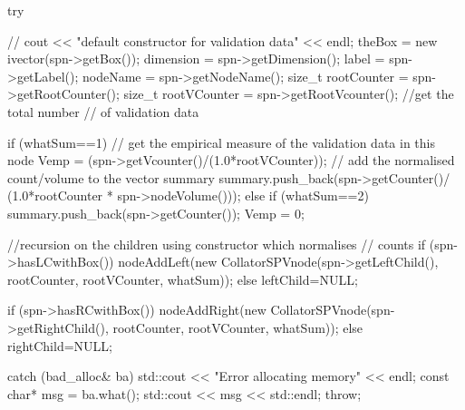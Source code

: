 \begin{DoxyCode}
    {
        try {
         //   cout << "default constructor for validation data" << endl;
            theBox = new ivector(spn->getBox());
            dimension = spn->getDimension();
            label = spn->getLabel();
            nodeName = spn->getNodeName();
            size_t rootCounter = spn->getRootCounter();
        size_t rootVCounter = spn->getRootVcounter(); //get the total number
                                                      // of validation data
        
        if (whatSum==1) {
          // get the empirical measure of the validation data in this node 
          Vemp = (spn->getVcounter()/(1.0*rootVCounter)); 
          // add the normalised count/volume to the vector summary          
          summary.push_back(spn->getCounter()/
                                (1.0*rootCounter * spn->nodeVolume()));       
        }
        else if (whatSum==2) {
          summary.push_back(spn->getCounter());
          Vemp = 0;
        }
        
            //recursion on the children using constructor which normalises 
        // counts
            if (spn->hasLCwithBox()) {
                nodeAddLeft(new CollatorSPVnode(spn->getLeftChild(),
                                               rootCounter, rootVCounter, 
                                               whatSum));
            }
            else leftChild=NULL;

            if (spn->hasRCwithBox()) {
                nodeAddRight(new CollatorSPVnode(spn->getRightChild(),
                                                rootCounter, rootVCounter,
                                                whatSum));
            }
            else rightChild=NULL;
        }
        catch (bad_alloc& ba) {
            std::cout << "Error allocating memory" << endl;
            const char* msg = ba.what();
            std::cout << msg << std::endl;
            throw;
        }

    }
\end{DoxyCode}
